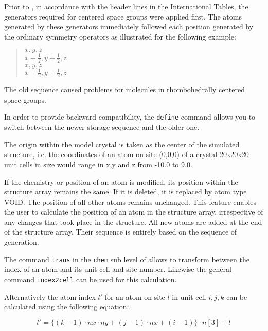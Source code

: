 Prior to , in accordance with the header lines in
the International Tables,
the generators required for centered space groups were applied first.
The atoms generated by these generators immediately followed each
position generated by the ordinary symmetry operators as illustrated
for the following example:

\begin{quote}
       $x,y,z$\\
       $x+\frac{1}{2},y+\frac{1}{2},z$\\
       $\overline{x},y,\overline{z}$\\
       $\overline{x}+\frac{1}{2},y+\frac{1}{2},\overline{z}$
\end{quote}

The old sequence caused problems for molecules in rhombohedrally
centered space groups. 

In order to provide backward compatibility, the {\tt define}
command allows you to switch between the newer storage sequence
and the older one.

The origin within the model crystal is taken as the center of the
simulated structure, i.e.  the coordinates of an atom on site
(0,0,0) of a crystal 20x20x20 unit cells in size would range in x,y
and z from -10.0 to 9.0.
\par

If the chemistry or position of an atom is modified, its position
within the structure array remains the same.  If it is deleted, it
is replaced by atom type VOID.  The position of all other atoms
remains unchanged.  This feature enables the user to calculate the
position of an atom in the structure array, irrespective of any
changes that took place in the structure.  All new atoms are added
at the end of the structure array. Their sequence is entirely based
on the sequence of generation. \par

The command {\tt trans} in the {\tt chem} sub level of \Discus
allows to transform between the index of an atom and its unit cell
and site number. Likewise the general \discus command
{\tt index2cell} can be used for this calculation. 

Alternatively the atom index $l'$ for an atom on
site $l$ in unit cell $i,j,k$ can be calculated using the following
equation:

\begin{equation}
        l' = \{ (k-1) \cdot nx \cdot ny +
                (j-1) \cdot nx +
                (i-1) \} \cdot n[3] + l
        \label{struc-store-eq}
\end{equation}

